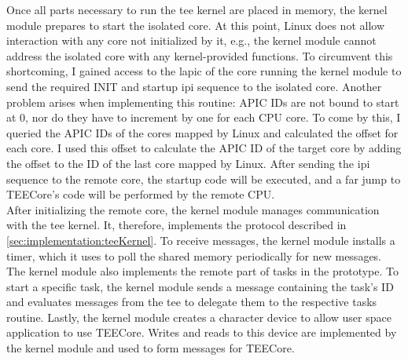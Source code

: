 Once all parts necessary to run the \gls{tee} kernel are placed in memory, the
kernel module prepares to start the isolated core. At this point, Linux does not
allow interaction with any core not initialized by it, e.g., the kernel module
cannot address the isolated core with any kernel-provided functions. To
circumvent this shortcoming, I gained access to the \gls{lapic} of the core
running the kernel module to send the required INIT and startup \gls{ipi}
sequence to the isolated core. Another problem arises when implementing this
routine: APIC IDs are not bound to start at 0, nor do they have to increment by
one for each CPU core. To come by this, I queried the APIC IDs of the cores
mapped by Linux and calculated the offset for each core. I used this offset to
calculate the APIC ID of the target core by adding the offset to the ID of the
last core mapped by Linux. After sending the \gls{ipi} sequence to the remote
core, the startup code will be executed, and a far jump to TEECore's code will
be performed by the remote CPU.\\

After initializing the remote core, the kernel module manages communication with
the \gls{tee} kernel. It, therefore, implements the protocol described in
\ref{sec:implementation:teeKernel}. To receive messages, the kernel module
installs a timer, which it uses to poll the shared memory periodically for new
messages. The kernel module also implements the remote part of tasks in the
prototype. To start a specific task, the kernel module sends a message
containing the task's ID and evaluates messages from the \gls{tee} to delegate
them to the respective tasks routine. Lastly, the kernel module creates a
character device to allow user space application to use TEECore. Writes and
reads to this device are implemented by the kernel module and used to form
messages for TEECore.



